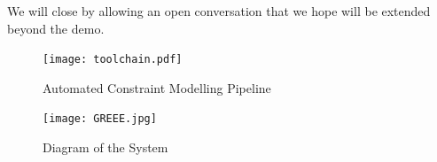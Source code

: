 \documentclass[runningheads]{llncs}
\begin{document}
We will close by allowing an open conversation that we hope will be extended beyond the demo.

\begin{figure}
  \centering
  \texttt{[image: toolchain.pdf]}
  \caption{Automated Constraint Modelling Pipeline}
  \label{fig:toolchain}
\end{figure}

\begin{figure}
  \centering
  \texttt{[image: GREEE.jpg]}
  \caption{Diagram of the System}
  \label{fig:GREEE}
\end{figure}
\end{document}
